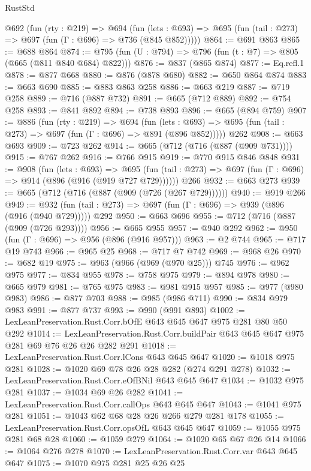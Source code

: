 \begin{lexlean}{RustStd}
\begin{coremodule}
  @692
    (fun (rty : @219) =>
    @694
      (fun (lets : @693) => @695 (fun (tail : @273) => @697 (fun (Γ : @696) => @736 (@845 @852)))))
@864 := @691 @863
@865 := @688 @864
@874 := @795 (fun (U : @794) => @796 (fun (t : @7) => @805 (@665 (@811 @840 @684) @822)))
@876 := @837 (@865 @874)
@877 := Eq.refl.{1}
@878 := @877 @668
@880 := @876 (@878 @680)
@882 := @650 @864 @874
@883 := @663 @690
@885 := @883 @863 @258
@886 := @663 @219
@887 := @719 @258
@889 := @716 (@887 @732)
@891 := @665 (@712 @889)
@892 := @754 @258
@893 := @841 @892
@894 := @738 @893
@896 := @665 (@894 @759)
@907 := @886
    (fun (rty : @219) =>
    @694
      (fun (lets : @693) => @695 (fun (tail : @273) => @697 (fun (Γ : @696) => @891 (@896 @852)))))
    @262
@908 := @663 @693
@909 := @723 @262
@914 := @665 (@712 (@716 (@887 (@909 @731))))
@915 := @767 @262
@916 := @766 @915
@919 := @770 @915 @846 @848
@931 := @908
    (fun (lets : @693) =>
    @695 (fun (tail : @273) => @697 (fun (Γ : @696) => @914 (@896 (@916 (@919 @727 @729))))))
    @266
@932 := @663 @273
@939 := @665 (@712 (@716 (@887 (@909 (@726 (@267 @729))))))
@940 := @919 @266
@949 := @932 (fun (tail : @273) => @697 (fun (Γ : @696) => @939 (@896 (@916 (@940 @729))))) @292
@950 := @663 @696
@955 := @712 (@716 (@887 (@909 (@726 @293))))
@956 := @665 @955
@957 := @940 @292
@962 := @950 (fun (Γ : @696) => @956 (@896 (@916 @957)))
@963 := @2 @744
@965 := @717 @19 @743
@966 := @965 @25
@968 := @717 @7 @742
@969 := @968 @26
@970 := @682 @19
@975 := @963 (@966 (@969 (@970 @25))) @745
@976 := @962 @975
@977 := @834 @955
@978 := @758 @975
@979 := @894 @978
@980 := @665 @979
@981 := @765 @975
@983 := @981 @915 @957
@985 := @977 (@980 @983)
@986 := @877 @703
@988 := @985 (@986 @711)
@990 := @834 @979 @983
@991 := @877 @737
@993 := @990 (@991 @893)
@1002 := LexLeanPreservation.Rust.Corr.bOfE @643 @645 @647 @975 @281 @80 @50 @292
@1014 := LexLeanPreservation.Rust.Corr.buildPair @643 @645 @647 @975 @281 @69 @76 @26 @26 @282 @291
@1018 := LexLeanPreservation.Rust.Corr.lCons @643 @645 @647
@1020 := @1018 @975 @281
@1028 := @1020 @69 @78 @26 @28 @282 (@274 @291 @278)
@1032 := LexLeanPreservation.Rust.Corr.eOfBNil @643 @645 @647
@1034 := @1032 @975 @281
@1037 := @1034 @69 @26 @282
@1041 := LexLeanPreservation.Rust.Corr.callOps @643 @645 @647
@1043 := @1041 @975 @281
@1051 := @1043 @62 @68 @28 @26 @266 @279 @281 @178
@1055 := LexLeanPreservation.Rust.Corr.opsOfL @643 @645 @647
@1059 := @1055 @975 @281 @68 @28
@1060 := @1059 @279
@1064 := @1020 @65 @67 @26 @14
@1066 := @1064 @276 @278
@1070 := LexLeanPreservation.Rust.Corr.var @643 @645 @647
@1075 := @1070 @975 @281 @25 @26 @25

\end{coremodule}
\end{lexlean}
